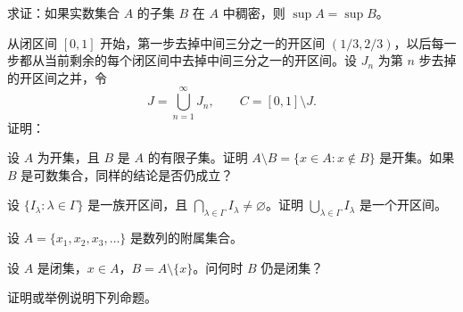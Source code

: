 \newpage
\noindent\begin{minipage}{\textwidth}
求证：如果实数集合 $A$ 的子集 $B$ 在 $A$ 中稠密，则 $\sup A=\sup B$。
\end{minipage}\par\vfill
\newpage
\noindent\begin{minipage}{\textwidth}
从闭区间 $[0,1]$ 开始，第一步去掉中间三分之一的开区间 $(1/3,2/3)$，以后每一步都从当前剩余的每个闭区间中去掉中间三分之一的开区间。设 $J_n$ 为第 $n$ 步去掉的开区间之并，令\[J=\bigcup_{n=1}^{\infty}J_n,\qquad C=[0,1]\setminus J.\]证明：
\end{minipage}\par\vfill
\newpage
\noindent\begin{minipage}{\textwidth}
设 $A$ 为开集，且 $B$ 是 $A$ 的有限子集。证明 $A\setminus B=\{x\in A:x\notin B\}$ 是开集。如果 $B$ 是可数集合，同样的结论是否仍成立？
\end{minipage}\par\vfill
\noindent\begin{minipage}{\textwidth}
设 $\{I_\lambda:\lambda\in\Gamma\}$ 是一族开区间，且 $\bigcap_{\lambda\in\Gamma}I_\lambda\ne\varnothing$。证明 $\bigcup_{\lambda\in\Gamma}I_\lambda$ 是一个开区间。
\end{minipage}\par\vfill
\noindent\begin{minipage}{\textwidth}
设 $A=\{x_1,x_2,x_3,\ldots\}$ 是数列的附属集合。
\end{minipage}\par\vfill
\noindent\begin{minipage}{\textwidth}
设 $A$ 是闭集，$x\in A$，$B=A\setminus\{x\}$。问何时 $B$ 仍是闭集？
\end{minipage}\par\vfill
\newpage
\noindent\begin{minipage}{\textwidth}
证明或举例说明下列命题。
\end{minipage}\par\vfill
